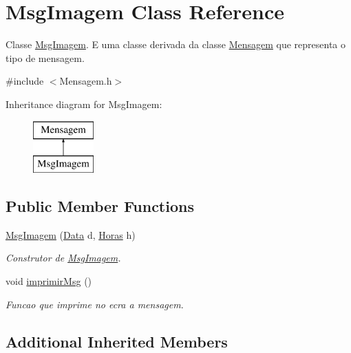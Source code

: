 \hypertarget{class_msg_imagem}{}\section{Msg\+Imagem Class Reference}
\label{class_msg_imagem}


Classe \hyperlink{class_msg_imagem}{Msg\+Imagem}. E uma classe derivada da classe \hyperlink{class_mensagem}{Mensagem} que representa o tipo de mensagem.  




{\ttfamily \#include $<$Mensagem.\+h$>$}

Inheritance diagram for Msg\+Imagem\+:\begin{figure}[H]
\begin{center}
\leavevmode
\includegraphics[height=2.000000cm]{class_msg_imagem}
\end{center}
\end{figure}
\subsection*{Public Member Functions}
\begin{DoxyCompactItemize}
\item 
\hyperlink{class_msg_imagem_af214317005643374b9886897ddc28e9c}{Msg\+Imagem} (\hyperlink{class_data}{Data} d, \hyperlink{class_horas}{Horas} h)
\begin{DoxyCompactList}\small\item\em Construtor de \hyperlink{class_msg_imagem}{Msg\+Imagem}. \end{DoxyCompactList}\item 
\hypertarget{class_msg_imagem_a70e0cf4e47ecaee095501d211e010e27}{}void \hyperlink{class_msg_imagem_a70e0cf4e47ecaee095501d211e010e27}{imprimir\+Msg} ()\label{class_msg_imagem_a70e0cf4e47ecaee095501d211e010e27}

\begin{DoxyCompactList}\small\item\em Funcao que imprime no ecra a mensagem. \end{DoxyCompactList}\end{DoxyCompactItemize}
\subsection*{Additional Inherited Members}


